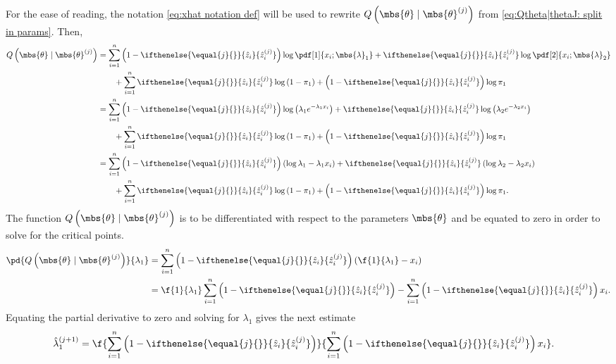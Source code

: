 \documentclass{tufte-handout}
\newcommand{\zhat}[2][{}]{\ifthenelse{\equal{#1}{}}{\hat{z}_{#2}}{\hat{z}_{#2}^{(#1)}}}
\begin{document}
    For the ease of reading, the notation \eqref{eq:xhat notation def} will be used to rewrite $Q\left( \mbs{\theta}\mid\mbs{\theta}^{(j)} \right)$ from \eqref{eq:Qtheta|thetaJ: split in params}. Then, 
    \begin{align}
        Q\left( \mbs{\theta} \mid \mbs{\theta}^{(j)} \right)
        &=
        \sum_{i=1}^{n} \left(1-\zhat[j]{i}\right) \log \pdf[1]{{x}_{i}; \mbs{\lambda}_{1}} + \zhat[j]{i}\log\pdf[2]{{x}_{i}; \mbs{\lambda}_{2}}
        \nonumber\\&\qquad
        +\sum_{i=1}^{n}\zhat[j]{i}\log\left( 1-\pi_{1} \right) + \left(1-\zhat[j]{i}\right)\log\pi_{1}\\
        &=
        \sum_{i=1}^{n} \left(1-\zhat[j]{i}\right) \log \left( \lambda_{1}e^{-\lambda_{1} x_{i}} \right) + \zhat[j]{i}\log\left(\lambda_{2}e^{-\lambda_{2} x_{i}}\right)
        \nonumber\\&\qquad
        +\sum_{i=1}^{n}\zhat[j]{i}\log\left( 1-\pi_{1} \right)  + \left(1-\zhat[j]{i}\right)\log\pi_{1}\\
        &=
        \sum_{i=1}^{n} \left(1-\zhat[j]{i}\right)  \left( \log\lambda_{1} -\lambda_{1} x_{i} \right) + \zhat[j]{i}\left(\log\lambda_{2} -\lambda_{2} x_{i}\right)
        \nonumber\\&\qquad
        +\sum_{i=1}^{n}\zhat[j]{i}\log\left( 1-\pi_{1} \right) + \left(1-\zhat[j]{i}\right)\log\pi_{1}.
    \end{align}
    The function $Q\left( \mbs{\theta}\mid \mbs{\theta}^{(j)} \right)$ is to be differentiated with respect to the parameters $\mbs{\theta}$ and be equated to zero in order to solve for the critical points.
    \begin{align}
        \pd{
            Q\left( \mbs{\theta}\mid \mbs{\theta}^{(j)} \right)
        }{
            \lambda_{1}
        }
        &= 
        \sum_{i=1}^{n} \left(1-\zhat[j]{i}\right)  \left( \f{1}{\lambda_{1}}- x_{i} \right)\\
        &= 
        \f{1}{\lambda_{1}}\sum_{i=1}^{n} \left(1-\zhat[j]{i}\right) 
        -
        \sum_{i=1}^{n} \left(1-\zhat[j]{i}\right) x_{i}.
    \end{align}
    Equating the partial derivative to zero and solving for $\lambda_{1}$ gives the next estimate
    \begin{align}
        \hat{\lambda}_{1}^{(j+1)} 
        &= 
        \f{
            \sum_{i=1}^{n} \left(1-\zhat[j]{i}\right)
        }{
            \sum_{i=1}^{n} \left(1-\zhat[j]{i}\right) x_{i}  
        }.
    \end{align}
\end{document}
